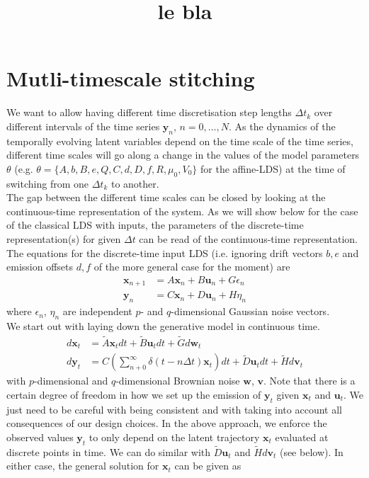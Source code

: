 \documentclass[10pt,letterpaper]{article}
\date{}
\newcommand{\xb}{\mathbf{x}}
\newcommand{\ub}{\mathbf{u}}
\newcommand{\wb}{\mathbf{w}}
\newcommand{\yb}{\mathbf{y}}
\newcommand{\vb}{\mathbf{v}}
\begin{document}
\title{le bla}
\maketitle
\section{Mutli-timescale stitching}

\noindent{}We want to allow having different time discretisation step lengths $\Delta{}t_k$ over different intervals of the time series $\yb_n$, $n = 0, \ldots, N$. 
As the dynamics of the temporally evolving latent variables depend on the time scale of the time series, different time scales will go along a change in the values of the model parameters $\theta$ (e.g. $\theta = \{A,b,B,e,Q,C,d,D,f,R, \mu_0, V_0 \}$ for the affine-LDS) at the time of switching from one $\Delta{}t_k$ to another. \\
\noindent{}The gap between the different time scales can be closed by looking at the continuous-time representation of the system. 
As we will show below for the case of the classical LDS with inputs, the parameters of the discrete-time representation(s) for given $\Delta{}t$ can be read of the continuous-time representation. \\
The equations for the discrete-time input LDS (i.e. ignoring drift vectors $b,e$ and emission offsets $d,f$ of the more general case for the moment) are 
\begin{align}
\xb_{n+1} &= A \xb_n + B \ub_n + G \epsilon_n 
\label{eq:inputLDS_discTime} \\
\yb_{n} &= C \xb_n  + D \ub_n + H \eta_n
\end{align}
where $\epsilon_n$, $\eta_n$ are independent $p$- and $q$-dimensional Gaussian noise vectors. \\
\noindent{}We start out with laying down the generative model in continuous time. 
\begin{align}
d{\xb_t} &= \tilde{A} \xb_t dt + \tilde{B} \ub_t dt + \tilde{G} d\wb_t
\label{eq:inputLDS_contTime} \\
d{\yb_t} &= C \left( \sum_{n+0}^\infty \delta{}(t - n\Delta{}t) \xb_t \right) dt + \tilde{D} \ub_t dt + \tilde{H} d\vb_t  
\end{align}
with $p$-dimensional and $q$-dimensional Brownian noise $\wb$, $\vb$. Note that there is a certain degree of freedom in how we set up the emission of $\yb_t$ given $\xb_t$ and $\ub_t$. We just need to be careful with being consistent and with taking into account all consequences of our design choices. In the above approach, we enforce the observed values $\yb_t$ to only depend on the latent trajectory $\xb_t$ evaluated at discrete points in time. We can do similar with $\tilde{D}\ub_t$ and $\tilde{H}d\vb_t$ (see below). In either case, the general solution for $\xb_t$ can be given as
\end{document}
